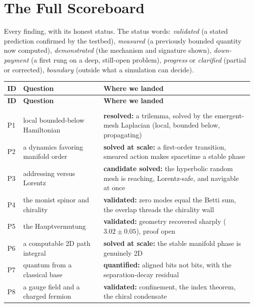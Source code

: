 \section{The Full Scoreboard}
\label{sec:scoreboard}

Every finding, with its honest status. The status words: \emph{validated} (a stated
prediction confirmed by the testbed), \emph{measured} (a previously bounded quantity now
computed), \emph{demonstrated} (the mechanism and signature shown), \emph{down-payment}
(a first rung on a deep, still-open problem), \emph{progress} or \emph{clarified}
(partial or corrected), \emph{boundary} (outside what a simulation can decide).

{\small
\setlength{\LTpre}{6pt}
\setlength{\LTpost}{6pt}
\begin{longtable}{>{\raggedright}p{} >{\raggedright}p{} >{\raggedright\arraybackslash}p{}}
\toprule
\textbf{ID} & \textbf{Question} & \textbf{Where we landed} \\
\midrule
\endfirsthead
\toprule
\textbf{ID} & \textbf{Question} & \textbf{Where we landed} \\
\midrule
\endhead
\midrule
\multicolumn{3}{r}{\footnotesize\itshape continued on the next page} \\
\endfoot
\bottomrule
\endlastfoot
P1 & local bounded-below Hamiltonian & \textbf{resolved:} a trilemma, solved by the emergent-mesh Laplacian (local, bounded below, propagating) \\
P2 & a dynamics favoring manifold order & \textbf{solved at scale:} a first-order transition, smeared action makes spacetime a stable phase \\
P3 & addressing versus Lorentz & \textbf{candidate solved:} the hyperbolic random mesh is reaching, Lorentz-safe, and navigable at once \\
P4 & the monist spinor and chirality & \textbf{validated:} zero modes equal the Betti sum, the overlap threads the chirality wall \\
P5 & the Hauptvermutung & \textbf{validated:} geometry recovered sharply ($3.02 \pm 0.05$), proof open \\
P6 & a computable 2D path integral & \textbf{solved at scale:} the stable manifold phase is genuinely 2D \\
P7 & quantum from a classical base & \textbf{quantified:} aligned bits not bits, with the separation-decay residual \\
P8 & a gauge field and a charged fermion & \textbf{validated:} confinement, the index theorem, the chiral condensate \\

\end{longtable}}
